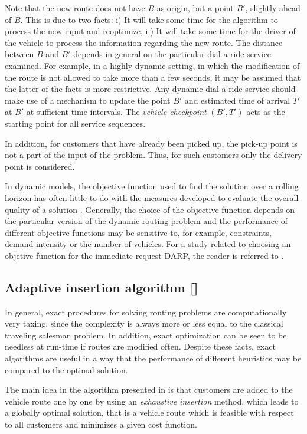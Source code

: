 \documentclass[dissertation,draft*]{aaltoseries}
\begin{document}
Note that the new route does not have $B$ as origin, but
a point $B'$, slightly ahead of $B$. This is due to two facts:
i) It will take some time for the algorithm to process the new input and reoptimize, 
ii) It will take some time for the driver
of the vehicle to process the information regarding the new route. 
The distance between $B$ and $B'$ depends in general on the particular 
dial-a-ride service examined. For example, in a highly dynamic setting,
in which the modification of the route is not
allowed to take more than a few seconds, it may be assumed that
the latter of the facts is more restrictive. 
Any dynamic dial-a-ride
service should make use of a mechanism to update the point $B'$
and estimated time of arrival $T'$ at $B'$ at sufficient time intervals.
The \emph{vehicle checkpoint} $(B',T')$ acts as the starting point for all service sequences.

	In addition, for customers that have already been picked up, the pick-up point 
	is not a part of the input of the problem. Thus, for such customers
	only the delivery point is considered.

	In dynamic models, the objective function
	used to find the solution over a rolling horizon has often little to do with
	the measures developed to evaluate the overall quality of a solution \cite{powell95}.
	Generally, the choice of the objective function depends 
	on the particular version of the dynamic routing problem and the performance
	of different objective functions may be sensitive to, for example, constraints, demand intensity
	or the number of vehicles. For a study related to choosing an objetive function
	for the immediate-request DARP, the reader is referred to \cite{Hyytia2010}.


\subsection{Adaptive insertion algorithm []}
In general, exact procedures for solving routing  
problems are computationally very taxing, since the complexity is always more or 
less equal to the classical traveling salesman problem.
In addition, exact optimization can be seen to be needless at run-time if routes are modified often. 
Despite these facts, exact algorithms are useful in a way that the 
performance of different heuristics may be compared to the optimal solution. 

The main idea in the algorithm presented in  is that customers are added to 
the vehicle route one by one by using an \emph{exhaustive insertion} method,
which leads to a globally optimal solution, that is a vehicle route 
which is feasible with respect to all customers and minimizes a given cost function. 
\end{document}
